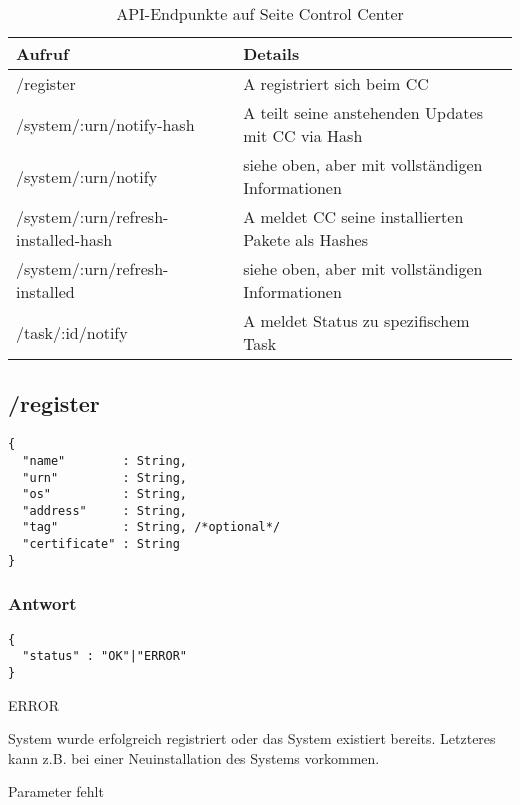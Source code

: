 \begin{table}[H]
    \centering
    \caption{API-Endpunkte auf Seite Control Center}
    \label{api:endpoints_cc}
    \begin{tabular}{ll}
        \hline
        \textbf{Aufruf}                     & \textbf{Details}                                  \\ \hline
        /register                           & A registriert sich beim CC                        \\
        /system/:urn/notify-hash            & A teilt seine anstehenden Updates mit CC via Hash \\
        /system/:urn/notify                 & siehe oben, aber mit vollständigen Informationen  \\
        /system/:urn/refresh-installed-hash & A meldet CC seine installierten Pakete als Hashes \\
        /system/:urn/refresh-installed      & siehe oben, aber mit vollständigen Informationen  \\
        /task/:id/notify                    & A meldet Status zu spezifischem Task              \\ \hline
    \end{tabular}
\end{table}

\subsection*{/register}

\begin{verbatim}
{
  "name"        : String,
  "urn"         : String,
  "os"          : String,
  "address"     : String,
  "tag"         : String, /*optional*/
  "certificate" : String
}
\end{verbatim}


\subsubsection*{Antwort}

\begin{verbatim}
{
  "status" : "OK"|"ERROR" 
}
\end{verbatim}

\begin{labeling}{ERROR}
    \item [OK] System wurde erfolgreich registriert oder das System existiert bereits. Letzteres kann z.B. bei einer Neuinstallation des Systems vorkommen.
    \item [ERROR] Parameter fehlt
\end{labeling}


